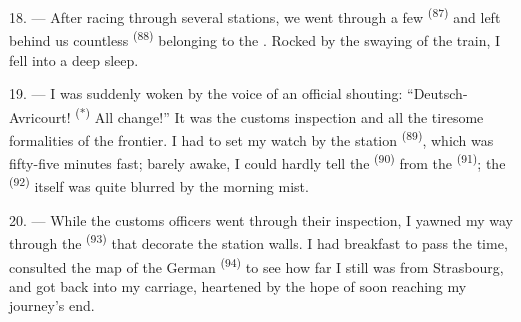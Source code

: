 18. --- After racing through several stations, we went through a few
 \textsuperscript{(87)} and left behind us countless
 \textsuperscript{(88)} belonging to the .
Rocked by the swaying of the train, I fell into a deep sleep.

\VUsaut{3.0mm}
\VUsaut{3.0mm}

19. --- I was suddenly woken by the voice of an official shouting: “Deutsch-Avricourt!
\textsuperscript{(*)} All change!” It was the customs inspection and all the tiresome
formalities of the frontier. I had to set my watch by the station 
\textsuperscript{(89)}, which was fifty-five minutes fast; barely awake, I could hardly tell
the  \textsuperscript{(90)} from the 
\textsuperscript{(91)}; the  \textsuperscript{(92)} itself was quite blurred by
the morning mist.

20. --- While the customs officers went through their inspection, I yawned my way through the
 \textsuperscript{(93)} that decorate the station walls. I had breakfast to
pass the time, consulted the map of the German  \textsuperscript{(94)} to see
how far I still was from Strasbourg, and got back into my carriage, heartened by the hope of
soon reaching my journey's end.
\VUsaut{6.0mm}
\VUfilet{22mm}
